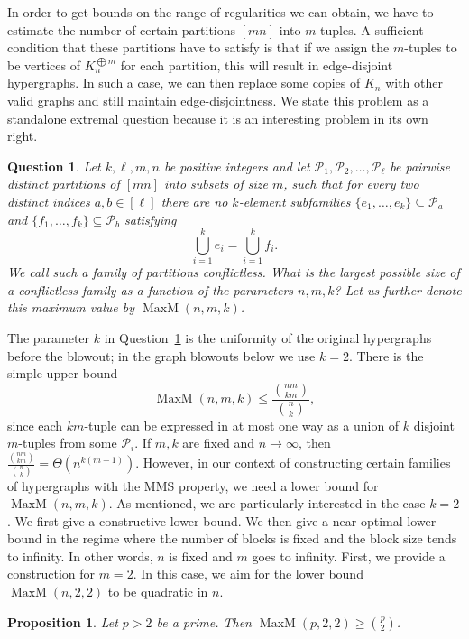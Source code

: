 \documentclass[12pt,UKenglish]{amsart}
\theoremstyle{plain}
\newtheorem{prop}[thm]{Proposition}
\newtheorem{q}[thm]{Question}
\theoremstyle{definition}
\theoremstyle{remark}
\begin{document}
In order to get bounds on the range of regularities we can obtain, we have to estimate the number of certain partitions $[mn]$ into $m$-tuples.
 A sufficient condition that these partitions have to satisfy is that if we assign the $m$-tuples to be vertices of $K_n^{\bigoplus m}$ for each partition, this will result in edge-disjoint hypergraphs.
 In such a case, we can then replace some copies of $K_n$ with other valid graphs and still maintain edge-disjointness.
 We state this problem as a standalone extremal question because it is an interesting problem in its own right.
 \begin{q}\label{q:partition}
  Let $k,\ell,m,n$ be positive integers and let $\mathcal{P}_1,\mathcal{P}_2,\dots,\mathcal{P}_\ell$ be pairwise distinct partitions of $[mn]$ into subsets of size $m$, such that for every two distinct indices $a,b\in[\ell]$ there are no $k$-element subfamilies $\{e_1,\dots,e_k\}\subseteq \mathcal{P}_a$ and $\{f_1,\dots,f_k\}\subseteq \mathcal{P}_b$ satisfying
  \[
  \bigcup_{i=1}^k e_i=\bigcup_{i=1}^k f_i.
  \]
 We call such a family of partitions conflictless. What is the largest possible size of a conflictless family as a function of the parameters $n,m,k$?
 Let us further denote this maximum value by $\operatorname{MaxM}(n,m,k)$.
\end{q}
The parameter $k$ in Question~\ref{q:partition} is the uniformity of the original hypergraphs before the blowout; in the graph blowouts below we use $k=2$.
 There is the simple upper bound
 \[
 \operatorname{MaxM}(n,m,k)\leq\frac{\binom{nm}{km}}{\binom{n}{k}},
 \]
 since each $km$-tuple can be expressed in at most one way as a union of $k$ disjoint $m$-tuples from some $\mathcal{P}_i$.
 If $m,k$ are fixed and $n\rightarrow\infty$, then $\frac{\binom{nm}{km}}{\binom{n}{k}}=\Theta(n^{k(m-1)})$. However, in our context of constructing certain families of hypergraphs with the MMS property, we need a lower bound for $\operatorname{MaxM}(n,m,k)$.
 As mentioned, we are particularly interested in the case $k=2$.
 We first give a constructive lower bound. We then give a near-optimal lower bound in the regime where the number of blocks is fixed and the block size tends to infinity. In other words, $n$ is fixed and $m$ goes to infinity.
 First, we provide a construction for $m=2$. In this case, we aim for the lower bound $\operatorname{MaxM}(n,2,2)$ to be quadratic in $n$.
 \begin{prop}\label{prop:maxm-p22}
  Let $p>2$ be a prime. Then $\operatorname{MaxM}(p,2,2)\ge\binom{p}{2}$.
 \end{prop}
\end{document}

